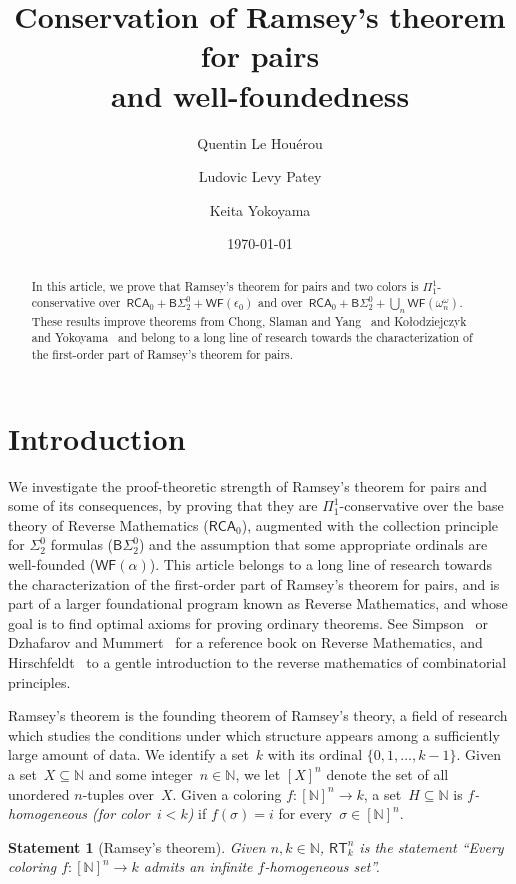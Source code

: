 \documentclass{article}
\author{Quentin Le Hou\'erou \and Ludovic Levy Patey \and Keita Yokoyama}
\title{Conservation of Ramsey's theorem for pairs\\ and well-foundedness}
\date{\today}
\numberwithin{theorem}{section}
\newtheorem{statement}[theorem]{Statement}
\newcommand{\RCA}{\mathsf{RCA}}
\newcommand{\BSig}{\mathsf{B}\Sigma^0}
\newcommand{\WF}{\mathsf{WF}}
\newcommand{\RT}{\mathsf{RT}}
\newcommand{\NN}{\mathbb{N}}
\def\qt#1{``#1''}%
\begin{document}
\maketitle

\begin{abstract}
In this article, we prove that Ramsey's theorem for pairs and two colors is  $\Pi^1_1$-conservative over~$\RCA_0 + \BSig_2 + \WF(\epsilon_0)$ and   over~$\RCA_0 + \BSig_2 + \bigcup_n \WF(\omega^\omega_n)$. These results improve theorems from Chong, Slaman and Yang~\cite{chong2017inductive} and Ko{\l}odziejczyk and Yokoyama~\cite{kolo2021search} and belong to a long line of research towards the characterization of the first-order part of Ramsey's theorem for pairs. 
\end{abstract}

\section{Introduction}

We investigate the proof-theoretic strength of Ramsey's theorem for pairs and some of its consequences, by proving that they are $\Pi^1_1$-conservative over the base theory of Reverse Mathematics ($\RCA_0$), augmented with the collection principle for $\Sigma^0_2$ formulas ($\BSig_2$) and the assumption that some appropriate ordinals are well-founded ($\WF(\alpha)$). This article belongs to a long line of research towards the characterization of the first-order part of Ramsey's theorem for pairs, and is part of a larger foundational program known as Reverse Mathematics, and whose goal is to find optimal axioms for proving ordinary theorems. See Simpson~\cite{simpson_2009} or Dzhafarov and Mummert~\cite{dzhafarov2022reverse} for a reference book on Reverse Mathematics, and Hirschfeldt~\cite{hirschfeldt2017slicing} to a gentle introduction to the reverse mathematics of combinatorial principles.

Ramsey's theorem is the founding theorem of Ramsey's theory, a field of research which studies the conditions under which structure appears among a sufficiently large amount of data. We identify a set~$k$ with its ordinal $\{0, 1, \dots, k-1\}$.  Given a set~$X \subseteq \NN$ and some integer~$n \in \NN$, we let $[X]^n$ denote the set of all unordered $n$-tuples over~$X$. 
Given a coloring $f : [\NN]^n \to k$, a set~$H \subseteq \NN$ is \emph{$f$-homogeneous (for color~$i < k$)}  if $f(\sigma) = i$ for every~$\sigma \in [\NN]^n$. 

\begin{statement}[Ramsey's theorem]
Given $n, k \in \NN$, $\RT^n_k$ is the statement \qt{Every coloring $f : [\NN]^n \to k$ admits an infinite $f$-homogeneous set}.
\end{statement}
\end{document}
